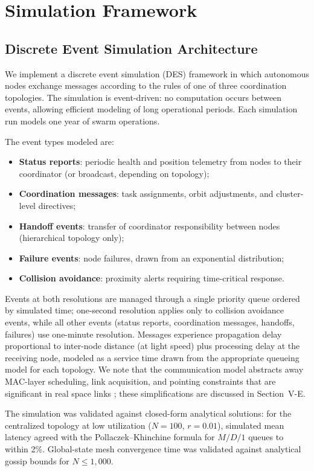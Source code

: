 \documentclass[journal]{IEEEtran}
\begin{document}
\section{Simulation Framework}

\subsection{Discrete Event Simulation Architecture}

We implement a discrete event simulation (DES) framework in which autonomous nodes exchange messages according to the rules of one of three coordination topologies. The simulation is event-driven: no computation occurs between events, allowing efficient modeling of long operational periods. Each simulation run models one year of swarm operations.

The event types modeled are:
\begin{itemize}
    \item \textbf{Status reports}: periodic health and position telemetry from nodes to their coordinator (or broadcast, depending on topology);
    \item \textbf{Coordination messages}: task assignments, orbit adjustments, and cluster-level directives;
    \item \textbf{Handoff events}: transfer of coordinator responsibility between nodes (hierarchical topology only);
    \item \textbf{Failure events}: node failures, drawn from an exponential distribution;
    \item \textbf{Collision avoidance}: proximity alerts requiring time-critical response.
\end{itemize}

Events at both resolutions are managed through a single priority queue ordered by simulated time; one-second resolution applies only to collision avoidance events, while all other events (status reports, coordination messages, handoffs, failures) use one-minute resolution. Messages experience propagation delay proportional to inter-node distance (at light speed) plus processing delay at the receiving node, modeled as a service time drawn from the appropriate queueing model for each topology. We note that the communication model abstracts away MAC-layer scheduling, link acquisition, and pointing constraints that are significant in real space links \cite{ccsds_prox1}; these simplifications are discussed in Section~V-E.

The simulation was validated against closed-form analytical solutions: for the centralized topology at low utilization ($N = 100$, $r = 0.01$), simulated mean latency agreed with the Pollaczek--Khinchine formula for $M/D/1$ queues to within 2\%. Global-state mesh convergence time was validated against analytical gossip bounds \cite{demers_gossip} for $N \leq 1{,}000$.
\end{document}
